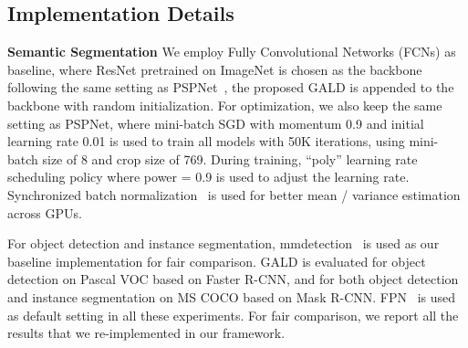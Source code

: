 \documentclass{bmvc2k}
\begin{document}
\subsection{Implementation Details}

{\bfseries Semantic Segmentation } We employ Fully Convolutional Networks (FCNs) as baseline, where ResNet pretrained on ImageNet is chosen as the backbone following the same setting as PSPNet~\cite{pspnet}, the proposed GALD is appended to the backbone with random initialization. For optimization, we also keep the same setting as PSPNet, where mini-batch SGD with momentum 0.9 and initial learning rate 0.01 is used to train all models with 50K iterations, using mini-batch size of 8 and crop size of 769. During training, ``poly'' learning rate scheduling policy where power = 0.9 is used to adjust the learning rate. Synchronized batch normalization~\cite{encodingnet} is used for better mean / variance estimation across GPUs.

 For object detection and instance segmentation, mmdetection~\cite{mmdetection2018} is used as our baseline implementation for fair comparison. GALD is evaluated for object detection on Pascal VOC based on Faster R-CNN, and for both object detection and instance segmentation on MS COCO based on Mask R-CNN. FPN~\cite{fpn} is used as default setting in all these experiments. For fair comparison, we report all the results that we re-implemented in our framework.
\end{document}
